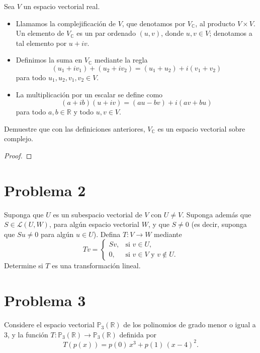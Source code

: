 \documentclass[11pt]{article}
\theoremstyle{definition} %
\newcommand{\R}{\mathbb{R}}
\begin{document}
Sea \(V\) un espacio vectorial real.

\begin{itemize}
  \item Llamamos la complejificación de \(V\), que denotamos por \(V_{\mathbb C}\), al producto \(V\times V\). Un elemento de \(V_{\mathbb C}\) es un par ordenado \((u,v)\), donde \(u,v\in V\); denotamos a tal elemento por \(u+iv\).
  \item Definimos la suma en \(V_{\mathbb C}\) mediante la regla
  \[
    (u_1+iv_1)+(u_2+iv_2)=(u_1+u_2)+i(v_1+v_2)
  \]
  para todo \(u_1,u_2,v_1,v_2\in V\).
  \item La multiplicación por un escalar se define como
  \[
    (a+ib)(u+iv)=(au-bv)+i(av+bu)
  \]
  para todo \(a,b\in\mathbb{R}\) y todo \(u,v\in V\).
\end{itemize}
Demuestre que con las definiciones anteriores, \(V_{\mathbb C}\) es un espacio vectorial sobre complejo.

\begin{proof}
  
\end{proof}

\section*{Problema 2}
Suponga que \(U\) es un subespacio vectorial de \(V\) con \(U\neq V\). Suponga además que \(S\in\mathcal L(U,W)\), para algún espacio vectorial \(W\), y que \(S\neq 0\) (es decir, suponga que \(Su\neq 0\) para algún \(u\in U\)). Defina \(T:V\to W\) mediante
\[
  Tv=
  \begin{cases}
    Sv, & \text{si } v\in U,\\[4pt]
    0,  & \text{si } v\in V \text{ y } v\not\in U.
  \end{cases}
\]
Determine si \(T\) es una transformación lineal.

\section*{Problema 3}
Considere el espacio vectorial \(\mathbb{P}_3(\R)\) de los polinomios de grado menor o igual a \(3\), y la función \(T:\mathbb{P}_3(\R)\to \mathbb{P}_3(\R)\) definida por
\[
  T(p(x)) = p(0)\,x^3 + p(1)\,(x-4)^2.
\]
\end{document}
